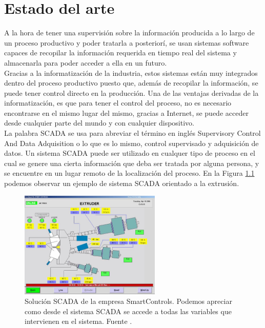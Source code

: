 
\chapter{Estado del arte}
\label{cap:estado}
A la hora de tener una supervisión sobre la información producida a lo largo de un proceso productivo y poder tratarla a posteriorí, se usan sistemas software capaces de recopilar la información requerida en tiempo real del sistema y almacenarla para poder acceder a ella en un futuro.\\

Gracias a la informatización de la industria, estos sistemas están muy integrados dentro del proceso productivo puesto que, además de recopilar la información, se puede tener control directo en la producción. Una de las ventajas derivadas de la informatización, es que para tener el control del proceso, no es necesario encontrarse en el mismo lugar del mismo, gracias a Internet, se puede acceder desde cualquier parte del mundo y con cualquier dispositivo.\\

La palabra SCADA se usa para abreviar el término en inglés Supervisory Control And Data Adquisition o lo que es lo mismo, control supervisado y adquisición de datos. Un sistema SCADA puede ser utilizado en cualquer tipo de proceso en el cual se genere una cierta información que deba ser tratada por alguna persona, y se encuentre en un lugar remoto de la localización del proceso. En la Figura \ref{fig:smart_Controls} podemos observar un ejemplo de sistema SCADA orientado a la extrusión.

\begin{figure}[h!]
    \centering
    \includegraphics[width=0.6\textwidth]{images/triplex-extruder.jpg}
    \caption[Solución SCADA de la empresa SmartControls.]{Solución SCADA de la empresa SmartControls. Podemos apreciar como desde el sistema SCADA se accede a todas las variables que intervienen en el sistema. Fuente \cite{smartcontrols}.}
    \label{fig:smart_Controls}
\end{figure}

